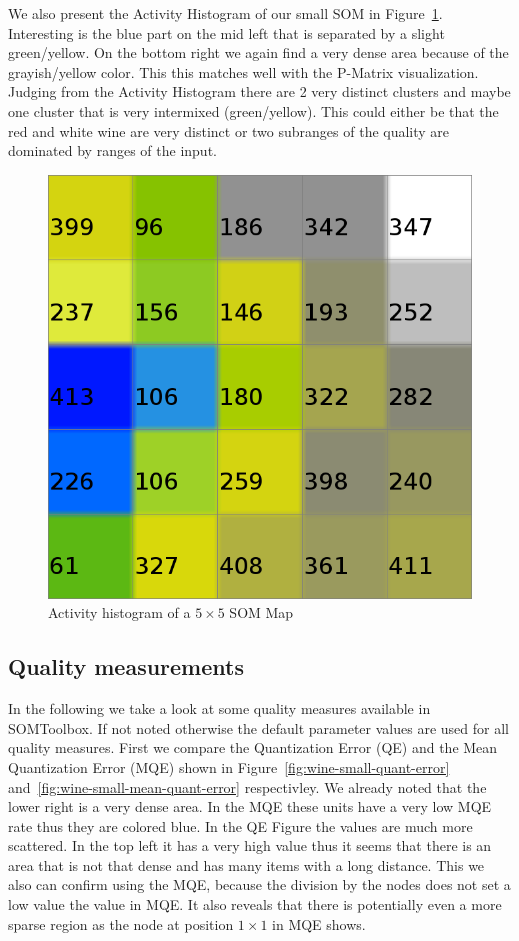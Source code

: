 \documentclass{acm_proc_article-sp}
\begin{document}
We also present the Activity Histogram of our small SOM in Figure~\ref{fig:wine-small-activity-histogram}.
Interesting is the blue part on the mid left that is separated by a slight green/yellow.
On the bottom right we again find a very dense area because of the grayish/yellow color. This this matches
well with the P-Matrix visualization. Judging from the Activity Histogram there are 2 very distinct clusters
and maybe one cluster that is very intermixed (green/yellow). This could either be that the
red and white wine are very distinct or two subranges of the quality are dominated by ranges of the input.

\begin{figure}
\centering
\includegraphics[width=0.5\linewidth]{img/wine-small-activity-histogram}
\caption{Activity histogram of a $5\times5$ SOM Map}
\label{fig:wine-small-activity-histogram}
\end{figure}

\subsection{Quality measurements}

In the following we take a look at some quality measures available in SOMToolbox.
If not noted otherwise the default parameter values are used for all quality measures.
First we compare the Quantization Error (QE) and the Mean Quantization Error (MQE) shown in
Figure~\ref{fig:wine-small-quant-error} and~\ref{fig:wine-small-mean-quant-error} respectivley.
We already noted that the lower right is a very dense area. In the MQE these units have a very low
MQE rate thus they are colored blue. In the QE Figure the values are much more scattered. In
the top left it has a very high value thus it seems that there is an area that is not that dense
and has many items with a long distance. This we also can confirm using the MQE, because the division
by the nodes does not set a low value the value in MQE. It also reveals that there is potentially even a more sparse
region as the node at position $1\times1$ in MQE shows.
\end{document}
